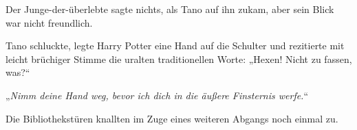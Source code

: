 Der Junge-der-überlebte sagte nichts, als Tano auf ihn zukam, aber sein Blick war nicht freundlich.

Tano schluckte, legte Harry Potter eine Hand auf die Schulter und rezitierte mit leicht brüchiger Stimme die uralten traditionellen Worte: „Hexen! Nicht zu fassen, was?“

„\emph{Nimm deine Hand weg, bevor ich dich in die äußere Finsternis werfe.}“

Die Bibliothekstüren knallten im Zuge eines weiteren Abgangs noch einmal zu.

